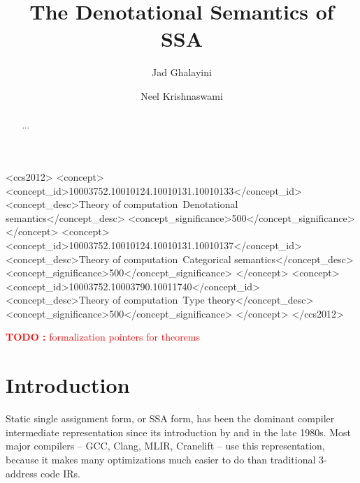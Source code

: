 \documentclass[acmsmall,screen,review]{acmart}
\newcounter{todos}
\newcommand{\TODO}[1]{{
  \stepcounter{todos}
  \begin{center}\large{\textcolor{red}{\textbf{TODO \arabic{todos}:} #1}}\end{center}
}}
\begin{document}
\title{The Denotational Semantics of SSA}

\author{Jad Ghalayini}

\author{Neel Krishnaswami}

\begin{abstract}
  ...
\end{abstract}

\begin{CCSXML}
  <ccs2012>
  <concept>
  <concept_id>10003752.10010124.10010131.10010133</concept_id>
  <concept_desc>Theory of computation~Denotational semantics</concept_desc>
  <concept_significance>500</concept_significance>
  </concept>
  <concept>
  <concept_id>10003752.10010124.10010131.10010137</concept_id>
  <concept_desc>Theory of computation~Categorical semantics</concept_desc>
  <concept_significance>500</concept_significance>
  </concept>
  <concept>
  <concept_id>10003752.10003790.10011740</concept_id>
  <concept_desc>Theory of computation~Type theory</concept_desc>
  <concept_significance>500</concept_significance>
  </concept>
  </ccs2012>
\end{CCSXML}




\maketitle

\TODO{formalization pointers for theorems}

\section{Introduction}

Static single assignment form, or SSA form, has been the dominant compiler intermediate
representation since its introduction by \citet{alpern-ssa-original-88} and \citet{rosen-gvn-1988}
in the late 1980s. Most major compilers -- GCC, Clang, MLIR, Cranelift -- use this representation,
because it makes many optimizations much easier to do than traditional 3-address code IRs.
\end{document}

